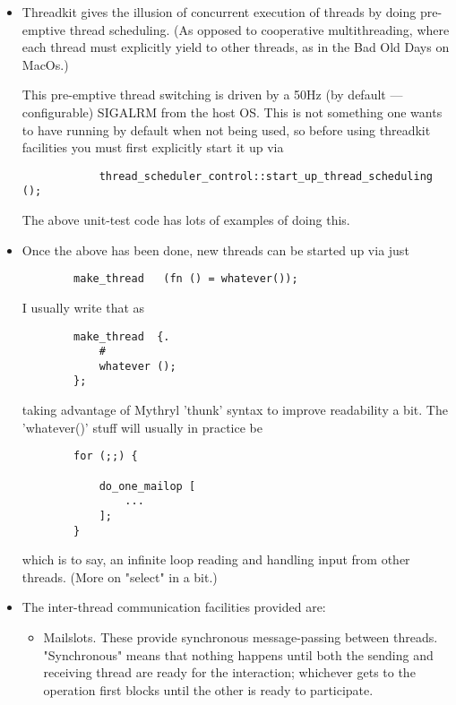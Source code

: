 \begin{itemize}
\item 
Threadkit gives the illusion of concurrent execution of threads by 
doing pre-emptive thread scheduling.  (As opposed to cooperative 
multithreading, where each thread must explicitly yield to other 
threads, as in the Bad Old Days on MacOs.) 

This pre-emptive thread switching is driven by 
a 50Hz (by default --- configurable) SIGALRM from 
the host OS.  This is not something one wants to have 
running by default when not being used, so before using 
threadkit facilities you must first explicitly start it up via 
\begin{verbatim}
            thread_scheduler_control::start_up_thread_scheduling ();
\end{verbatim}

The above unit-test code has lots of examples of doing this. 

\item 
Once the above has been done, new threads can be started 
up via just 

\begin{verbatim}
        make_thread   (fn () = whatever());
\end{verbatim}

I usually write that as 

\begin{verbatim}
        make_thread  {.
            #
            whatever ();
        };
\end{verbatim}

taking advantage of Mythryl 'thunk' syntax to improve 
readability a bit.  The 'whatever()' stuff will usually 
in practice be

\begin{verbatim}
        for (;;) {

            do_one_mailop [
                ...
            ];
        }
\end{verbatim}

which is to say, an infinite loop reading and handling 
input from other threads.  (More on "select" in a bit.) 

\item The inter-thread communication facilities provided are:


\begin{itemize}
\item 
Mailslots.  These provide synchronous message-passing 
between threads.  "Synchronous" means that nothing 
happens until both the sending and receiving thread 
are ready for the interaction;  whichever gets to the 
operation first blocks until the other is ready to 
participate. 


\end{itemize}
\end{itemize}
